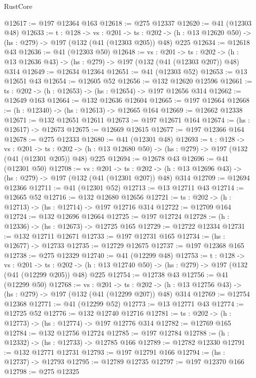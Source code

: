 \begin{lexlean}{RustCore}
\begin{coremodule}
@12617 := @197 @12364 @163
@12618 := @275 @12337
@12620 := @41 (@12303 @48)
@12633 := {t : @128} ->
  {vs : @201} ->
  {ts : @202} -> (h : @13 @12620 @50) -> (hs : @279) -> @197 (@132 (@41 (@12303 @205)) @48) @225
@12634 := @12618 @43
@12636 := @41 (@12303 @50)
@12648 := {vs : @201} ->
  {ts : @202} -> (h : @13 @12636 @43) -> (hs : @279) -> @197 (@132 (@41 (@12303 @207)) @48) @314
@12649 := @12634 @12364
@12651 := @41 (@12303 @52)
@12653 := @13 @12651 @43
@12654 := @12605 @52
@12656 := @132 @12620 @12596
@12661 := {ts : @202} -> (h : @12653) -> (hs : @12654) -> @197 @12656 @314
@12662 := @12649 @163
@12664 := @132 @12636 @12604
@12665 := @197 @12664
@12668 := (h : @12340) -> (hs : @12613) -> @12665 @164
@12669 := @12662 @12338
@12671 := @132 @12651 @12611
@12673 := @197 @12671 @164
@12674 := (hs : @12617) -> @12673
@12675 := @12669 @12615
@12677 := @197 @12366 @164
@12678 := @275 @12333
@12680 := @41 (@12301 @48)
@12693 := {t : @128} ->
  {vs : @201} ->
  {ts : @202} -> (h : @13 @12680 @50) -> (hs : @279) -> @197 (@132 (@41 (@12301 @205)) @48) @225
@12694 := @12678 @43
@12696 := @41 (@12301 @50)
@12708 := {vs : @201} ->
  {ts : @202} -> (h : @13 @12696 @43) -> (hs : @279) -> @197 (@132 (@41 (@12301 @207)) @48) @314
@12709 := @12694 @12366
@12711 := @41 (@12301 @52)
@12713 := @13 @12711 @43
@12714 := @12665 @52
@12716 := @132 @12680 @12656
@12721 := {ts : @202} -> (h : @12713) -> (hs : @12714) -> @197 @12716 @314
@12722 := @12709 @164
@12724 := @132 @12696 @12664
@12725 := @197 @12724
@12728 := (h : @12336) -> (hs : @12673) -> @12725 @165
@12729 := @12722 @12334
@12731 := @132 @12711 @12671
@12733 := @197 @12731 @165
@12734 := (hs : @12677) -> @12733
@12735 := @12729 @12675
@12737 := @197 @12368 @165
@12738 := @275 @12329
@12740 := @41 (@12299 @48)
@12753 := {t : @128} ->
  {vs : @201} ->
  {ts : @202} -> (h : @13 @12740 @50) -> (hs : @279) -> @197 (@132 (@41 (@12299 @205)) @48) @225
@12754 := @12738 @43
@12756 := @41 (@12299 @50)
@12768 := {vs : @201} ->
  {ts : @202} -> (h : @13 @12756 @43) -> (hs : @279) -> @197 (@132 (@41 (@12299 @207)) @48) @314
@12769 := @12754 @12368
@12771 := @41 (@12299 @52)
@12773 := @13 @12771 @43
@12774 := @12725 @52
@12776 := @132 @12740 @12716
@12781 := {ts : @202} -> (h : @12773) -> (hs : @12774) -> @197 @12776 @314
@12782 := @12769 @165
@12784 := @132 @12756 @12724
@12785 := @197 @12784
@12788 := (h : @12332) -> (hs : @12733) -> @12785 @166
@12789 := @12782 @12330
@12791 := @132 @12771 @12731
@12793 := @197 @12791 @166
@12794 := (hs : @12737) -> @12793
@12795 := @12789 @12735
@12797 := @197 @12370 @166
@12798 := @275 @12325

\end{coremodule}
\end{lexlean}
